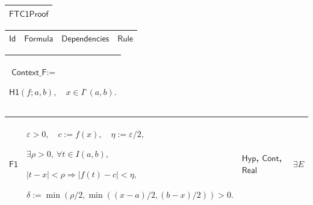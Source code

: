\documentclass[11pt]{amsart}
\renewcommand{\arraystretch}{1.4}
\newlength{\FTCOneColumnBody}
\newlength{\FTCFourColumnBody}
\begin{document}
{\centering
\renewcommand{\arraystretch}{1.4}
\par\setlength{\parskip}{0pt}\nointerlineskip
\noindent
\begin{tabular}{|@{}>{\centering\arraybackslash}m{\FTCOneColumnBody}|}\hline
$\displaystyle \textsf{FTC1Proof}$\\ \hline
\end{tabular}%
\par\setlength{\parskip}{0pt}\nointerlineskip
\noindent
\begin{tabular}{|@{}>{\centering\arraybackslash}m{0.078431\FTCFourColumnBody}|>{\centering\arraybackslash}m{0.535947\FTCFourColumnBody}|>{\centering\arraybackslash}m{0.281045\FTCFourColumnBody}|>{\centering\arraybackslash}m{0.104575\FTCFourColumnBody}|}\hline
$\displaystyle \textsf{Id}$ & $\displaystyle \textsf{Formula}$ & $\displaystyle \textsf{Dependencies}$ & $\displaystyle \textsf{Rule}$\\ \hline
\end{tabular}%
\par\setlength{\parskip}{0pt}\nointerlineskip
\noindent
\begin{tabular}{|@{}>{\centering\arraybackslash}m{\FTCOneColumnBody}|}\hline
$\displaystyle \textsf{Context\_F}:=$\par
$\displaystyle \textsf{H1}(f;a,b),\quad x\in I^\circ(a,b).$\\ \hline
\end{tabular}%
\par\setlength{\parskip}{0pt}\nointerlineskip
\noindent
\begin{tabular}{|@{}>{\centering\arraybackslash}m{0.078431\FTCFourColumnBody}|>{\centering\arraybackslash}m{0.535947\FTCFourColumnBody}|>{\centering\arraybackslash}m{0.281045\FTCFourColumnBody}|>{\centering\arraybackslash}m{0.104575\FTCFourColumnBody}|}\hline
\hypertarget{proof:F1}{$\displaystyle \textsf{F1}$} & $\displaystyle \varepsilon>0,\quad c:=f(x),\quad\eta:=\varepsilon/2,$\par
$\displaystyle \exists\rho>0,\ \forall t\in I(a,b),$\par
$\displaystyle |t-x|<\rho\Rightarrow|f(t)-c|<\eta,$\par
$\displaystyle \delta:=\min(\rho/2,\min((x-a)/2,(b-x)/2))>0.$ & \hyperlink{def:Hyp}{$\displaystyle \textsf{Hyp}$}, \hyperlink{def:Cont}{$\displaystyle \textsf{Cont}$}, \hyperlink{ax:Real}{$\displaystyle \textsf{Real}$} & $\displaystyle \exists E$\\ \hline
\end{tabular}%
}
\end{document}
